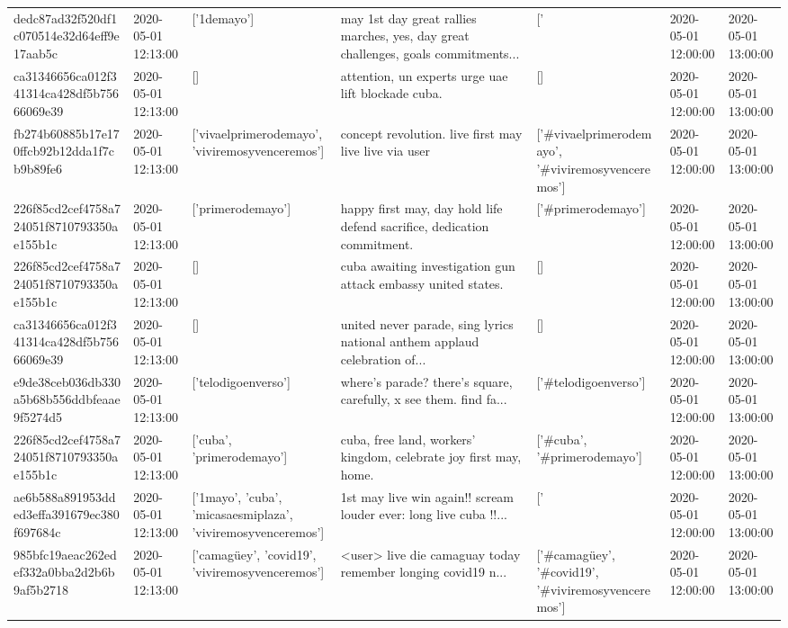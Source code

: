 \begin{tabular}{lllllll}
dedc87ad32f520df1c070514e32d64eff9e17aab5c & 2020-05-01 12:13:00 & ['1demayo'] & may 1st day great rallies marches, yes, day great challenges, goals commitments... & ['#1demayo'] & 2020-05-01 12:00:00 & 2020-05-01 13:00:00 \\
ca31346656ca012f341314ca428df5b75666069e39 & 2020-05-01 12:13:00 & [] & attention, un experts urge uae lift blockade cuba. & [] & 2020-05-01 12:00:00 & 2020-05-01 13:00:00 \\
fb274b60885b17e170ffcb92b12dda1f7cb9b89fe6 & 2020-05-01 12:13:00 & ['vivaelprimerodemayo', 'viviremosyvenceremos'] & concept revolution. live first may live live via user & ['#vivaelprimerodemayo', '#viviremosyvenceremos'] & 2020-05-01 12:00:00 & 2020-05-01 13:00:00 \\
226f85cd2cef4758a724051f8710793350ae155b1c & 2020-05-01 12:13:00 & ['primerodemayo'] & happy first may, day hold life defend sacrifice, dedication commitment. & ['#primerodemayo'] & 2020-05-01 12:00:00 & 2020-05-01 13:00:00 \\
226f85cd2cef4758a724051f8710793350ae155b1c & 2020-05-01 12:13:00 & [] & cuba awaiting investigation gun attack embassy united states. & [] & 2020-05-01 12:00:00 & 2020-05-01 13:00:00 \\
ca31346656ca012f341314ca428df5b75666069e39 & 2020-05-01 12:13:00 & [] & united never parade, sing lyrics national anthem applaud celebration of... & [] & 2020-05-01 12:00:00 & 2020-05-01 13:00:00 \\
e9de38ceb036db330a5b68b556ddbfeaae9f5274d5 & 2020-05-01 12:13:00 & ['telodigoenverso'] & where's parade? there's square, carefully, x see them. find fa... & ['#telodigoenverso'] & 2020-05-01 12:00:00 & 2020-05-01 13:00:00 \\
226f85cd2cef4758a724051f8710793350ae155b1c & 2020-05-01 12:13:00 & ['cuba', 'primerodemayo'] & cuba, free land, workers' kingdom, celebrate joy first may, home. & ['#cuba', '#primerodemayo'] & 2020-05-01 12:00:00 & 2020-05-01 13:00:00 \\
ae6b588a891953dded3effa391679ec380f697684c & 2020-05-01 12:13:00 & ['1mayo', 'cuba', 'micasaesmiplaza', 'viviremosyvenceremos'] & 1st may live win again!!️ scream louder ever: long live cuba !!️... & ['#1mayo', '#cuba', '#micasaesmiplaza', '#viviremosyvenceremos'] & 2020-05-01 12:00:00 & 2020-05-01 13:00:00 \\
985bfc19aeac262edef332a0bba2d2b6b9af5b2718 & 2020-05-01 12:13:00 & ['camagüey', 'covid19', 'viviremosyvenceremos'] & <user> live die camaguay today remember longing covid19 n... & ['#camagüey', '#covid19', '#viviremosyvenceremos'] & 2020-05-01 12:00:00 & 2020-05-01 13:00:00 \\

\end{tabular}
